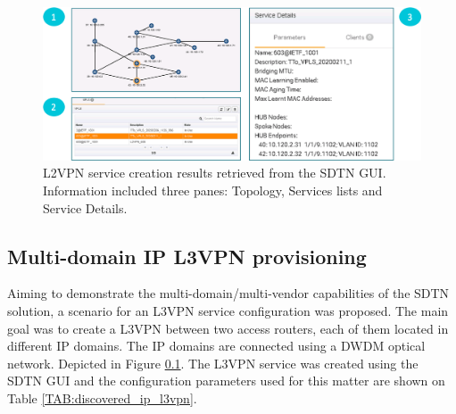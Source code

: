 \documentclass[a4paper,fleqn]{cas-dc}
\begin{document}
\begin{figure}
	\centering
		\includegraphics[width=\linewidth]{figs/l2vpn_results.png}
	\caption{L2VPN service creation results retrieved from the SDTN GUI. Information included three panes: Topology, Services lists and Service Details.}
	\label{FIG:L2SM_results}
\end{figure}


\subsection{Multi-domain IP L3VPN provisioning}

Aiming to demonstrate the multi-domain/multi-vendor capabilities of the SDTN solution, a scenario for an L3VPN service configuration was proposed. The main goal was to create a L3VPN between two access routers, each of them located in different IP domains. The IP domains are connected using a DWDM optical network. Depicted in Figure \ref{}. The L3VPN service was created using the SDTN GUI and the configuration parameters used for this matter are shown on Table \ref{TAB:discovered_ip_l3vpn}.
\end{document}
